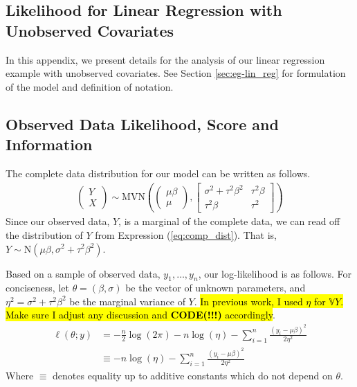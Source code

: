 \documentclass[11pt, oneside]{article}   	%
\newcommand{\bV}{\mathbb{V}}
\begin{document}
\begin{appendices}
    \section{Likelihood for Linear Regression with Unobserved Covariates}

    In this appendix, we present details for the analysis of our linear regression example with unobserved covariates. See Section \ref{sec:eg-lin_reg} for formulation of the model and definition of notation.

    \subsection{Observed Data Likelihood, Score and Information}

    The complete data distribution for our model can be written as follows.
    \begin{align}
        \begin{pmatrix} Y \\ X \end{pmatrix} 
        \sim \mathrm{MVN}\left( \begin{pmatrix}
            \mu \beta\\
            \mu
        \end{pmatrix}, \begin{bmatrix}
            \sigma^2 + \tau^2 \beta^2 & \tau^2 \beta\\
            \tau^2 \beta & \tau^2
        \end{bmatrix} \right) \label{eq:comp_dist}
    \end{align}
    Since our observed data, $Y$, is a marginal of the complete data, we can read off the distribution of $Y$ from Expression (\ref{eq:comp_dist}). That is, $Y \sim \mathrm{N}(\mu \beta, \sigma^2 + \tau^2 \beta^2)$.

    Based on a sample of observed data, $y_1,\ldots, y_n$, our log-likelihood is as follows. For conciseness, let $\theta = (\beta, \sigma)$ be the vector of unknown parameters, and $\eta^2 = \sigma^2 + \tau^2 \beta^2$ be the marginal variance of $Y$. \hl{In previous work, I used $\eta$ for $\bV Y$. Make sure I adjust any discussion and \textbf{CODE(!!!)} accordingly}.
    \begin{align}
        \ell(\theta; y) &= - \frac{n}{2} \log (2 \pi) - n \log (\eta) - \sum_{i=1}^n \frac{(y_i - \mu \beta)^2}{2 \eta^2}\\
        &\equiv -n \log (\eta) - \sum_{i=1}^n \frac{(y_i - \mu \beta)^2}{2 \eta^2}
    \end{align}
    Where $\equiv$ denotes equality up to additive constants which do not depend on $\theta$.


\end{appendices}
\end{document}
